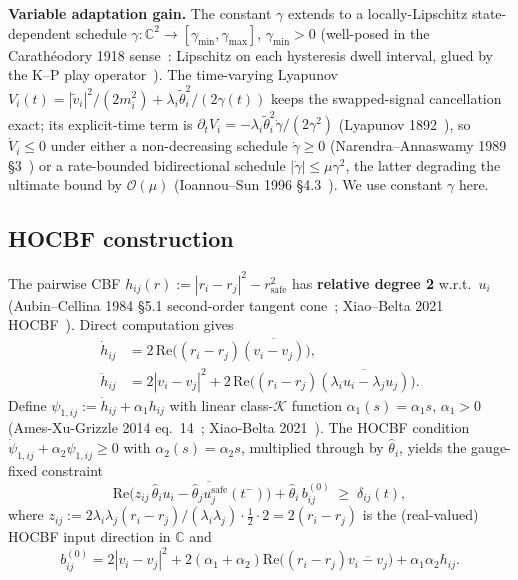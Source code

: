\documentclass[letterpaper,10pt,conference]{IEEEtran}
\newcommand{\rsafe}{r_{\text{safe}}}
\newcommand{\thethat}{\hat\theta}
\renewcommand{\Re}{\mathrm{Re}}
\begin{document}
\textbf{Variable adaptation gain.} The constant $\gamma$ extends to a locally-Lipschitz state-dependent schedule $\gamma : \mathbb{C}^2 \to [\gamma_{\min}, \gamma_{\max}]$, $\gamma_{\min} > 0$ (well-posed in the Carath\'eodory 1918 sense~\cite{caratheodory1918}: Lipschitz on each hysteresis dwell interval, glued by the K--P play operator~\cite{krasnoselskii1989}). The time-varying Lyapunov $V_i(t) = |\tilde v_i|^2/(2m_i^2) + \lambda_i\tilde\theta_i^2/(2\gamma(t))$ keeps the swapped-signal cancellation exact; its explicit-time term is $\partial_t V_i = -\lambda_i\tilde\theta_i^2\dot\gamma/(2\gamma^2)$ (Lyapunov 1892~\cite{lyapunov1892}), so $\dot V_i \le 0$ under either a non-decreasing schedule $\dot\gamma \ge 0$ (Narendra--Annaswamy 1989 §3~\cite{narendraAnnaswamy1989}) or a rate-bounded bidirectional schedule $|\dot\gamma| \le \mu\gamma^2$, the latter degrading the ultimate bound by $\mathcal{O}(\mu)$ (Ioannou--Sun 1996 §4.3~\cite{ioannouSun1996}). We use constant $\gamma$ here.

\subsection{HOCBF construction}\label{sec:cbf}
The pairwise CBF $h_{ij}(r) := |r_i - r_j|^2 - \rsafe^2$ has \textbf{relative degree 2} w.r.t.\ $u_i$ (Aubin--Cellina 1984 §5.1 second-order tangent cone~\cite{aubinCellina1984}; Xiao--Belta 2021 HOCBF~\cite{xiaoBelta2021}). Direct computation gives
\begin{align}
\dot h_{ij} &= 2\,\Re\!\big((r_i - r_j)\overline{(v_i - v_j)}\big), \nonumber\\
\ddot h_{ij} &= 2|v_i - v_j|^2 + 2\,\Re\!\big((r_i - r_j)\overline{(\lambda_i u_i - \lambda_j u_j)}\big). \nonumber
\end{align}
Define $\psi_{1,ij} := \dot h_{ij} + \alpha_1 h_{ij}$ with linear class-$\mathcal{K}$ function $\alpha_1(s) = \alpha_1 s$, $\alpha_1 > 0$ (Ames-Xu-Grizzle 2014 eq.~14~\cite{amesXuGrizzle2014}; Xiao-Belta 2021~\cite{xiaoBelta2021}). The HOCBF condition $\dot\psi_{1,ij} + \alpha_2 \psi_{1,ij} \ge 0$ with $\alpha_2(s) = \alpha_2 s$, multiplied through by $\thethat_i$, yields the gauge-fixed constraint
\begin{equation}
\Re\!\big(z_{ij}\,\overline{\thethat_i u_i - \thethat_j u_j^{\text{safe}}(t^-)}\big) + \thethat_i\, b_{ij}^{(0)} \;\ge\; \delta_{ij}(t),
\nonumber
\end{equation}
where $z_{ij} := 2\lambda_i\lambda_j(r_i-r_j)/(\lambda_i\lambda_j) \cdot \frac{1}{2}\cdot 2 = 2(r_i - r_j)$ is the (real-valued) HOCBF input direction in $\mathbb{C}$ and
\begin{equation}
b_{ij}^{(0)} = 2|v_i - v_j|^2 + 2(\alpha_1+\alpha_2)\Re\!\big((r_i - r_j)\overline{v_i - v_j}\big) + \alpha_1\alpha_2 h_{ij}.
\nonumber
\end{equation}
\end{document}
